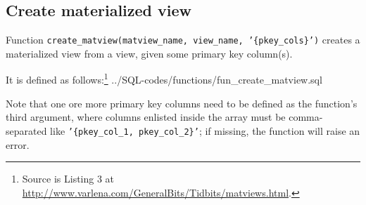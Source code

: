 \subsection{Create materialized view}\label{subsec_appx_fun_create_matview}

Function \texttt{create\_matview(matview\_name, view\_name, '\{pkey\_cols\}')} creates a materialized view from a view, given some primary key column(s).

It is defined as follows:\footnote{Source is Listing 3 at \url{http://www.varlena.com/GeneralBits/Tidbits/matviews.html}.} 
%
{../SQL-codes/functions/fun_create_matview.sql}

Note that one ore more primary key columns need to be defined as the function's third argument, where columns enlisted inside the array must be comma-separated like \texttt{'\{pkey\_col\_1, pkey\_col\_2\}'}; if missing, the function will raise an error.

